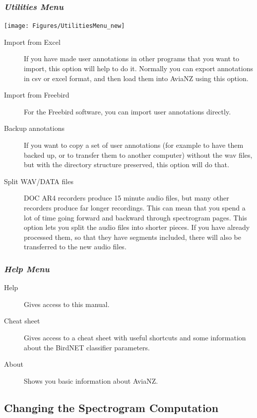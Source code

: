 \documentclass{scrartcl}
\begin{document}
\subsubsection{\textit{Utilities Menu} \label{sec:utilities}}

\begin{center}
\texttt{[image: Figures/UtilitiesMenu\_new]}
\end{center}

\begin{description}
\item [Import from Excel] If you have made user annotations in other programs that you want to import, this option will help to do it. Normally you can export annotations in csv or excel format, and then load them into AviaNZ using this option.
\item [Import from Freebird] For the Freebird software, you can import user annotations directly.
\item[Backup annotations] If you want to copy a set of user annotations (for example to have them backed up, or to transfer them to another computer) without the wav files, but with the directory structure preserved, this option will do that. 
\item[Split WAV/DATA files] DOC AR4 recorders produce 15 minute audio files, but many other recorders produce far longer recordings. This can mean that you spend a lot of time going forward and backward through spectrogram pages. This option lets you split the audio files into shorter pieces. If you have already processed them, so that they have segments included, there will also be transferred to the new audio files.
\end{description}

\subsubsection{\textit{Help Menu}}

\begin{description}
\item [Help] Gives access to this manual.
\item [Cheat sheet] Gives access to a cheat sheet with useful shortcuts and some information about the BirdNET classifier parameters.
\item[About] Shows you basic information about AviaNZ.
\end{description}

\subsection{Changing the Spectrogram Computation}\label{sec:spectrogram2}
\end{document}
